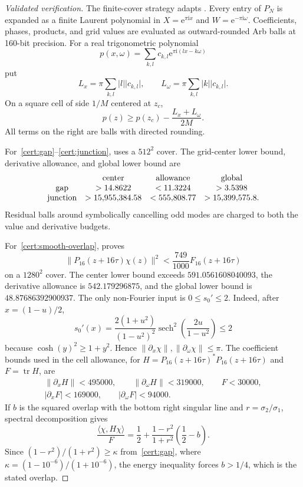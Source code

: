 \documentclass[10pt,a4paper]{amsart}
\numberwithin{equation}{section}
\newcommand{\ip}[2]{\langle #1,#2\rangle}
\newcommand{\norm}[1]{\lVert #1\rVert}
\newcommand{\abs}[1]{\lvert #1\rvert}
\newcommand{\e}{\mathrm e}
\newcommand{\ii}{\mathrm i}
\begin{document}
\begin{proof}[Validated verification]
The finite-cover strategy adapts \cite[\S5 and ancillary code]{FPPV2026}.
Every entry of $P_N$ is expanded as a finite Laurent polynomial in
$X=\e^{\pi\ii x}$ and $W=\e^{-\pi\ii\omega}$.  Coefficients, phases, products,
and grid values are evaluated as outward-rounded Arb balls at 160-bit
precision.  For a real trigonometric polynomial
\[
 p(x,\omega)=\sum_{k,l}c_{k,l}\e^{\pi\ii(lx-k\omega)}
\]
put
\begin{equation}\label{eq:fourier-derivative-bounds}
 L_x=\pi\sum_{k,l}|l|\abs{c_{k,l}},\qquad
 L_\omega=\pi\sum_{k,l}|k|\abs{c_{k,l}}.
\end{equation}
On a square cell of side $1/M$ centered at $z_c$,
\begin{equation}\label{eq:cell-cover}
 p(z)\ge p(z_c)-\frac{L_x+L_\omega}{2M}.
\end{equation}
All terms on the right are balls with directed rounding.

For~\ref{cert:gap}--\ref{cert:junction},
 uses a $512^2$ cover.
The grid-center lower bound, derivative allowance, and global lower bound are
\[
\begin{array}{c@{\quad}c@{\quad}c@{\quad}c}
&\text{center}&\text{allowance}&\text{global}\\
\text{gap}&>14.8622&<11.3224&>3.5398\\
\text{junction}&>15{,}955{,}384.58&<555{,}808.77&
>15{,}399{,}575.8.
\end{array}
\]
Residual balls around symbolically cancelling odd modes are charged to both
the value and derivative budgets.

For~\ref{cert:smooth-overlap},
 proves
\[
 \norm{P_{16}(z+16\tau)\chi(z)}^2
 <\frac{749}{1000}F_{16}(z+16\tau)
\]
on a $1280^2$ cover.  The center lower bound exceeds $591.0561608040093$, the
derivative allowance is $542.179296875$, and the global lower bound is
$48.87686392900937$.  The only non-Fourier input is $0\le s_0'\le2$.
Indeed, after $x=(1-u)/2$,
\[
 s_0'(x)=\frac{2(1+u^2)}{(1-u^2)^2}
 \operatorname{sech}^2\!\left(\frac{2u}{1-u^2}\right)\le2
\]
because $\cosh(y)^2\ge1+y^2$.  Hence
$\norm{\partial_x\chi},\norm{\partial_\omega\chi}\le\pi$.  The coefficient
bounds used in the cell allowance, for
$H=P_{16}(z+16\tau)^*P_{16}(z+16\tau)$ and $F=\operatorname{tr}H$, are
\[
\begin{gathered}
 \norm{\partial_x H}<495000,\qquad
 \norm{\partial_\omega H}<319000,\qquad F<30000,\\
 |\partial_x F|<169000,\qquad |\partial_\omega F|<94000.
\end{gathered}
\]
If $b$ is the squared overlap with the bottom right singular line and
$r=\sigma_2/\sigma_1$, spectral decomposition gives
\[
 \frac{\ip{\chi}{H\chi}}{F}
 =\frac12+\frac{1-r^2}{1+r^2}\left(\frac12-b\right).
\]
Since $(1-r^2)/(1+r^2)\ge\kappa$ from~\ref{cert:gap}, where
$\kappa=(1-10^{-6})/(1+10^{-6})$, the energy inequality
forces $b>1/4$, which is the stated overlap.


\end{proof}
\end{document}
